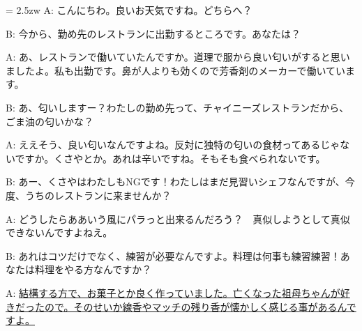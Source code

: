 \documentclass[11pt]{amsart}
\title{}
\author{}
\newenvironment{hangall}[1]{\hangindent = 2.5zw\everypar{\hangindent = 2.5zw}}{}
\begin{document}
\maketitle
\begin{hangall}{}%
A: こんにちわ。良いお天気ですね。どちらへ？

B: 今から、勤め先のレストランに出勤するところです。あなたは？

A: あ、レストランで働いていたんですか。道理で服から良い匂いがすると思いましたよ。私も出勤です。鼻が人よりも効くので芳香剤のメーカーで働いています。

B: あ、匂いしますー？わたしの勤め先って、チャイニーズレストランだから、ごま油の匂いかな？

A: ええそう、良い匂いなんですよね。反対に独特の匂いの食材ってあるじゃないですか。くさやとか。あれは辛いですね。そもそも食べられないです。

B: あー、くさやはわたしもNGです！わたしはまだ見習いシェフなんですが、今度、うちのレストランに来ませんか？

A: どうしたらああいう風にパラっと出来るんだろう？　真似しようとして真似できないんですよねえ。

B: あれはコツだけでなく、練習が必要なんですよ。料理は何事も練習練習！あなたは料理をやる方なんですか？

A: \ul{結構する方で、お菓子とか良く作っていました。亡くなった祖母ちゃんが好きだったので。そのせいか線香やマッチの残り香が懐かしく感じる事があるんですよ。}\end{hangall}
\end{document}
